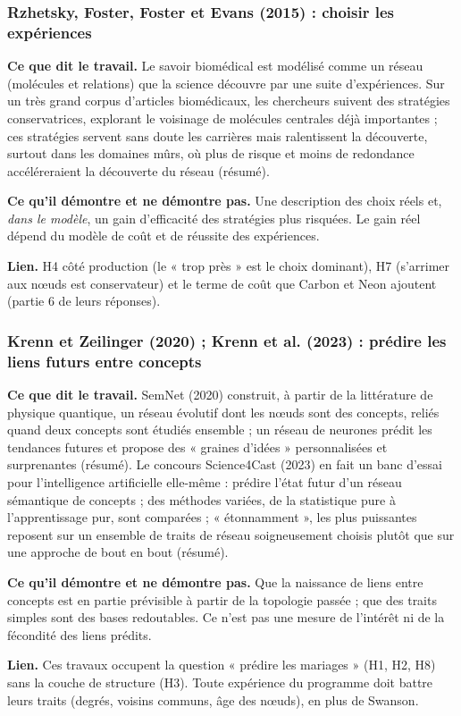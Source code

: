 \documentclass[a4paper,11pt]{article}
\newcommand{\cours}[1]{\par\smallskip\textbf{\textsf{#1}}\enspace}
\begin{document}
\subsubsection{Rzhetsky, Foster, Foster et Evans (2015) : choisir les expériences}
\cours{Ce que dit le travail.} Le savoir biomédical est modélisé comme un réseau (molécules et relations) que la science découvre par une suite d'expériences. Sur un très grand corpus d'articles biomédicaux, les chercheurs suivent des stratégies conservatrices, explorant le voisinage de molécules centrales déjà importantes ; ces stratégies servent sans doute les carrières mais ralentissent la découverte, surtout dans les domaines mûrs, où plus de risque et moins de redondance accéléreraient la découverte du réseau (résumé).
\cours{Ce qu'il démontre et ne démontre pas.} Une description des choix réels et, \emph{dans le modèle}, un gain d'efficacité des stratégies plus risquées. Le gain réel dépend du modèle de coût et de réussite des expériences.
\cours{Lien.} H4 côté production (le « trop près » est le choix dominant), H7 (s'arrimer aux nœuds est conservateur) et le terme de coût que Carbon et Neon ajoutent (partie 6 de leurs réponses).

\subsubsection{Krenn et Zeilinger (2020) ; Krenn et al. (2023) : prédire les liens futurs entre concepts}
\cours{Ce que dit le travail.} SemNet (2020) construit, à partir de la littérature de physique quantique, un réseau évolutif dont les nœuds sont des concepts, reliés quand deux concepts sont étudiés ensemble ; un réseau de neurones prédit les tendances futures et propose des « graines d'idées » personnalisées et surprenantes (résumé). Le concours Science4Cast (2023) en fait un banc d'essai pour l'intelligence artificielle elle-même : prédire l'état futur d'un réseau sémantique de concepts ; des méthodes variées, de la statistique pure à l'apprentissage pur, sont comparées ; « étonnamment », les plus puissantes reposent sur un ensemble de traits de réseau soigneusement choisis plutôt que sur une approche de bout en bout (résumé).
\cours{Ce qu'il démontre et ne démontre pas.} Que la naissance de liens entre concepts est en partie prévisible à partir de la topologie passée ; que des traits simples sont des bases redoutables. Ce n'est pas une mesure de l'intérêt ni de la fécondité des liens prédits.
\cours{Lien.} Ces travaux occupent la question « prédire les mariages » (H1, H2, H8) sans la couche de structure (H3). Toute expérience du programme doit battre leurs traits (degrés, voisins communs, âge des nœuds), en plus de Swanson.
\end{document}

